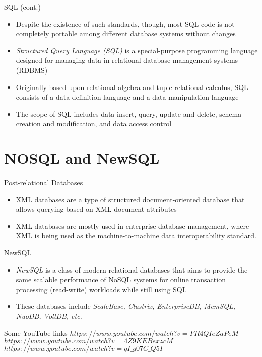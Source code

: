 \documentclass{beamer}
\begin{document}
\begin{frame}{SQL (cont.)}
\begin{itemize}
\item Despite the existence of such standards, though, most SQL code is not completely portable among different database systems without changes
\item \emph{Structured Query Language (SQL)} is a special-purpose programming language designed for managing data in relational database management systems (RDBMS)
\item Originally based upon relational algebra and tuple relational calculus, SQL consists of a data definition language and a data manipulation language 
\item The scope of SQL includes data insert, query, update and delete, schema creation and modification, and data access control
\end{itemize}
\end{frame}

\section[]{NOSQL and NewSQL}
\begin{frame}{Post-relational Databases}
\begin{itemize}
\item XML databases are a type of structured document-oriented database that allows querying based on XML document attributes 
\item XML databases are mostly used in enterprise database management, where XML is being used as the machine-to-machine data interoperability standard. 
\end{itemize}
\end{frame}

\begin{frame}{NewSQL}
\begin{itemize}
\item \emph{NewSQL} is a class of modern relational databases that aims to provide the same scalable performance of NoSQL systems for online transaction processing (read-write) workloads while still using SQL
\item These databases include \emph{ScaleBase, Clustrix, EnterpriseDB, MemSQL, NuoDB,  VoltDB, etc.} 
\end{itemize}
\end{frame}

\begin{frame}{Some YouTube links}
$https://www.youtube.com/watch?v=FR4QIeZaPeM$\\
$https://www.youtube.com/watch?v=4Z9KEBexzcM$\\
$https://www.youtube.com/watch?v=qI\_g07C\_Q5I$\\
\end{frame}
\end{document}
